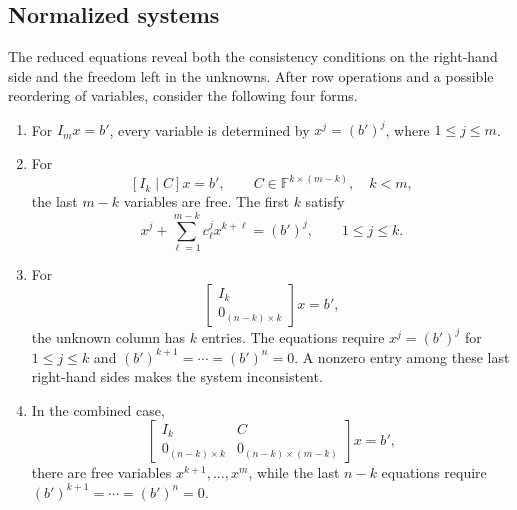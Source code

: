 \subsection{Normalized systems}

The reduced equations reveal both the consistency conditions on the
right-hand side and the freedom left in the unknowns. After row operations
and a possible reordering of variables, consider the following four forms.

\begin{enumerate}
  \item For \(I_mx=b'\), every variable is determined by
    \(x^j=(b')^j\), where \(1\leq j\leq m\).
  \item For
    \[
      [I_k\mid C]x=b',\qquad C\in\mathbb F^{k\times(m-k)},\quad k<m,
    \]
    the last \(m-k\) variables are free. The first \(k\) satisfy
    \[
      x^j+\sum_{\ell=1}^{m-k} c^j_\ell x^{k+\ell}=(b')^j,
      \qquad 1\leq j\leq k.
    \]
  \item For
    \[
      \begin{bmatrix}I_k\\0_{(n-k)\times k}\end{bmatrix}x=b',
    \]
    the unknown column has \(k\) entries. The equations require
    \(x^j=(b')^j\) for \(1\leq j\leq k\) and
    \((b')^{k+1}=\cdots=(b')^n=0\). A nonzero entry among these last
    right-hand sides makes the system inconsistent.
  \item In the combined case,
    \[
      \begin{bmatrix}
        I_k&C\\
        0_{(n-k)\times k}&0_{(n-k)\times(m-k)}
      \end{bmatrix}x=b',
    \]
    there are free variables \(x^{k+1},\ldots,x^m\), while the last
    \(n-k\) equations require \((b')^{k+1}=\cdots=(b')^n=0\).
\end{enumerate}


